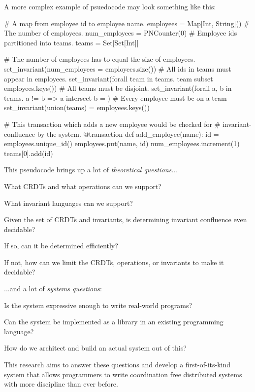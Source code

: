 A more complex example of psuedocode may look something like this:

\begin{Python}
# A map from employee id to employee name.
employees = Map[Int, String]()
# The number of employees.
num_employees = PNCounter(0)
# Employee ids partitioned into teams.
teams = Set[Set[Int]]

# The number of employees has to equal the size of employees.
set_invariant(num_employees = employees.size())
# All ids in teams must appear in employees.
set_invariant(forall team in teams. team subset employees.keys())
# All teams must be disjoint.
set_invariant(forall a, b in teams. a != b => a intersect b = {})
# Every employee must be on a team
set_invariant(union(teams) = employees.keys())

# This transaction which adds a new employee would be checked for
# invariant-confluence by the system.
@transaction
def add_employee(name):
  id = employees.unique_id()
  employees.put(name, id)
  num_employees.increment(1)
  teams[0].add(id)
\end{Python}

This pseudocode brings up a lot of \emph{theoretical questions}...
\begin{inparaitem}
  \item What CRDTs and what operations can we support?
  \item What invariant languages can we support?
  \item Given the set of CRDTs and invariants, is determining invariant
    confluence even decidable?
  \item If so, can it be determined efficiently?
  \item If not, how can we limit the CRDTs, operations, or invariants to make
    it decidable?
\end{inparaitem}
...and a lot of \emph{systems questions}:
\begin{inparaitem}
  \item Is the system expressive enough to write real-world programs?
  \item Can the system be implemented as a library in an existing programming
    language?
  \item How do we architect and build an actual system out of this?
\end{inparaitem}

This research aims to answer these questions and develop a first-of-its-kind
system that allows programmers to write coordination free distributed systems
with more discipline than ever before.
